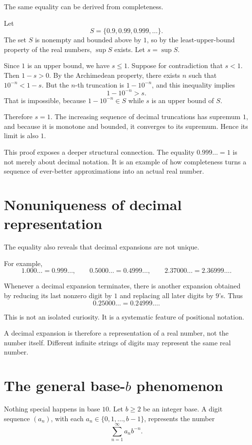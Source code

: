 \documentclass{essay}
\begin{document}
The same equality can be derived from completeness.

Let
\[ S=\{0.9,0.99,0.999,\ldots\}. \]
The set \(S\) is nonempty and bounded above by \(1\), so by the least-upper-bound property of the real numbers, \(\sup S\) exists. Let \(s=\sup S\).

Since \(1\) is an upper bound, we have \(s\le1\). Suppose for contradiction that \(s<1\). Then \(1-s>0\). By the Archimedean property, there exists \(n\) such that \(10^{-n}<1-s\). But the \(n\)-th truncation is \(1-10^{-n}\), and this inequality implies
\[ 1-10^{-n}>s. \]
That is impossible, because \(1-10^{-n}\in S\) while \(s\) is an upper bound of \(S\).

Therefore \(s=1\). The increasing sequence of decimal truncations has supremum \(1\), and because it is monotone and bounded, it converges to its supremum. Hence its limit is also \(1\).

This proof exposes a deeper structural connection. The equality \(0.999\ldots=1\) is not merely about decimal notation. It is an example of how completeness turns a sequence of ever-better approximations into an actual real number.

\section{Nonuniqueness of decimal representation}

The equality also reveals that decimal expansions are not unique.

For example,
\[ 1.000\ldots=0.999\ldots, \qquad 0.5000\ldots=0.4999\ldots, \qquad 2.37000\ldots=2.36999\ldots. \]

Whenever a decimal expansion terminates, there is another expansion obtained by reducing its last nonzero digit by \(1\) and replacing all later digits by \(9\)'s. Thus
\[ 0.25000\ldots=0.24999\ldots. \]

This is not an isolated curiosity. It is a systematic feature of positional notation.

A decimal expansion is therefore a representation of a real number, not the number itself. Different infinite strings of digits may represent the same real number.

\section{The general base-\texorpdfstring{\(b\)}{b} phenomenon}

Nothing special happens in base \(10\). Let \(b\ge2\) be an integer base. A digit sequence \((a_{n})\), with each \(a_{n}\in\{0,1,\ldots,b-1\}\), represents the number
\[ \sum_{n=1}^{\infty}a_{n} b^{-n}. \]
\end{document}
